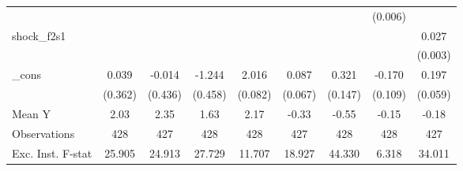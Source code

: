 {\begin{tabular}{l*{8}{c}}
            &                     &                     &                     &                     &                     &                     &     (0.006)         &                     \\
\addlinespace
shock\_f2s1  &                     &                     &                     &                     &                     &                     &                     &       0.027\sym{***}\\
            &                     &                     &                     &                     &                     &                     &                     &     (0.003)         \\
\addlinespace
\_cons      &       0.039         &      -0.014         &      -1.244\sym{**} &       2.016\sym{***}&       0.087         &       0.321\sym{**} &      -0.170         &       0.197\sym{***}\\
            &     (0.362)         &     (0.436)         &     (0.458)         &     (0.082)         &     (0.067)         &     (0.147)         &     (0.109)         &     (0.059)         \\
\midrule
Mean Y      &        2.03         &        2.35         &        1.63         &        2.17         &       -0.33         &       -0.55         &       -0.15         &       -0.18         \\
Observations&         428         &         427         &         428         &         428         &         427         &         428         &         428         &         427         \\
Exc. Inst. F-stat&      25.905         &      24.913         &      27.729         &      11.707         &      18.927         &      44.330         &       6.318         &      34.011         \\
\bottomrule
\end{tabular}
}
